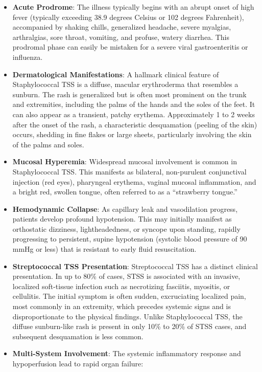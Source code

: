 \begin{itemize}
    \item \textbf{Acute Prodrome}: The illness typically begins with an abrupt onset of high fever (typically exceeding 38.9 degrees Celsius or 102 degrees Fahrenheit), accompanied by shaking chills, generalized headache, severe myalgias, arthralgias, sore throat, vomiting, and profuse, watery diarrhea. This prodromal phase can easily be mistaken for a severe viral gastroenteritis or influenza.
    \item \textbf{Dermatological Manifestations}: A hallmark clinical feature of Staphylococcal TSS is a diffuse, macular erythroderma that resembles a sunburn. The rash is generalized but is often most prominent on the trunk and extremities, including the palms of the hands and the soles of the feet. It can also appear as a transient, patchy erythema. Approximately 1 to 2 weeks after the onset of the rash, a characteristic desquamation (peeling of the skin) occurs, shedding in fine flakes or large sheets, particularly involving the skin of the palms and soles.
    \item \textbf{Mucosal Hyperemia}: Widespread mucosal involvement is common in Staphylococcal TSS. This manifests as bilateral, non-purulent conjunctival injection (red eyes), pharyngeal erythema, vaginal mucosal inflammation, and a bright red, swollen tongue, often referred to as a ``strawberry tongue.''
    \item \textbf{Hemodynamic Collapse}: As capillary leak and vasodilation progress, patients develop profound hypotension. This may initially manifest as orthostatic dizziness, lightheadedness, or syncope upon standing, rapidly progressing to persistent, supine hypotension (systolic blood pressure of 90 mmHg or less) that is resistant to early fluid resuscitation.
    \item \textbf{Streptococcal TSS Presentation}: Streptococcal TSS has a distinct clinical presentation. In up to 80\% of cases, STSS is associated with an invasive, localized soft-tissue infection such as necrotizing fasciitis, myositis, or cellulitis. The initial symptom is often sudden, excruciating localized pain, most commonly in an extremity, which precedes systemic signs and is disproportionate to the physical findings. Unlike Staphylococcal TSS, the diffuse sunburn-like rash is present in only 10\% to 20\% of STSS cases, and subsequent desquamation is less common.
    \item \textbf{Multi-System Involvement}: The systemic inflammatory response and hypoperfusion lead to rapid organ failure:

\end{itemize}

